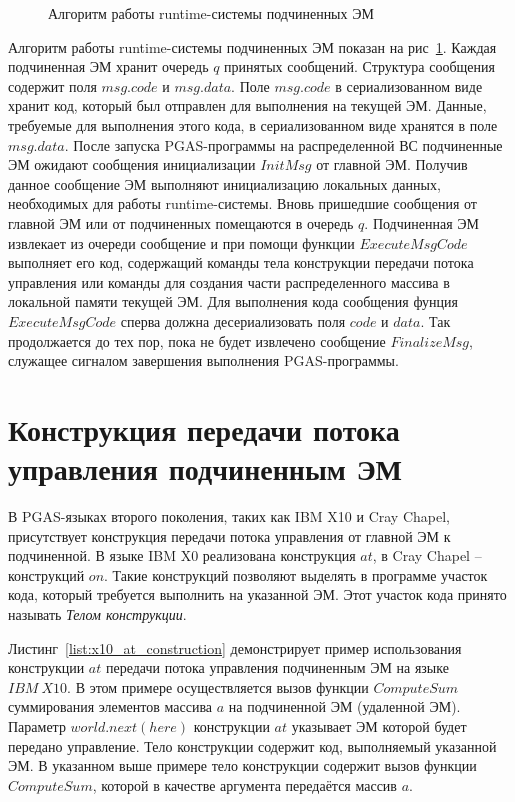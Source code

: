 \begin{figure}[!h]
	
    \caption{Алгоритм работы runtime-системы подчиненных ЭМ}
    \label{list:runtime_slave}
\end{figure}

Алгоритм работы runtime-системы подчиненных ЭМ показан на
рис~\ref{list:runtime_slave}. Каждая подчиненная ЭМ хранит очередь $q$ принятых
сообщений. Структура сообщения содержит поля $msg.code$ и $msg.data$. Поле
$msg.code$ в сериализованном виде хранит код, который был отправлен для
выполнения на текущей ЭМ. Данные, требуемые для выполнения этого кода,
в сериализованном виде хранятся в поле $msg.data$. После запуска PGAS-программы
на распределенной ВС подчиненные ЭМ ожидают сообщения инициализации $InitMsg$
от главной ЭМ. Получив данное сообщение ЭМ выполняют инициализацию локальных
данных, необходимых для работы runtime-системы. Вновь пришедшие сообщения
от главной ЭМ или от подчиненных помещаются в очередь $q$. Подчиненная ЭМ
извлекает из очереди сообщение и при помощи функции $ExecuteMsgCode$ выполняет
его код, содержащий команды тела конструкции передачи потока управления или
команды для создания части распределенного массива в локальной памяти текущей
ЭМ. Для выполнения кода сообщения фунция $ExecuteMsgCode$ сперва должна
десериализовать поля $code$ и $data$. Так продолжается до тех пор, пока не будет
извлечено сообщение $FinalizeMsg$, служащее сигналом завершения выполнения
PGAS-программы.

\section{Конструкция передачи потока управления подчиненным ЭМ}

В PGAS-языках второго поколения, таких как IBM X10 и Cray Chapel, присутствует
конструкция передачи потока управления от главной ЭМ к подчиненной. В языке
IBM X0 реализована конструкция $at$, в Cray Chapel -- конструкций $on$. Такие
конструкций позволяют выделять в программе участок кода, который требуется
выполнить на указанной ЭМ. Этот участок кода принято называть
\textit{Телом конструкции}.

\begin{ListingEnv}[ht]
	\small {}
    \caption{Пример использования конструкции $at$ на языке $IBM\ X10$}
    \label{list:x10_at_construction}
\end{ListingEnv}

Листинг~\ref{list:x10_at_construction} демонстрирует пример использования
конструкции $at$ передачи потока управления подчиненным ЭМ на языке $IBM\ X10$.
В этом примере осуществляется вызов функции $ComputeSum$ суммирования элементов
массива $a$ на подчиненной ЭМ (удаленной ЭМ). Параметр $world.next(here)$
конструкции $at$ указывает ЭМ которой будет передано управление. Тело
конструкции содержит код, выполняемый указанной ЭМ. В указанном выше примере
тело конструкции содержит вызов функции $ComputeSum$, которой в качестве
аргумента передаётся массив $a$.

